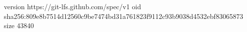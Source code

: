 version https://git-lfs.github.com/spec/v1
oid sha256:809e8b7514d12560c9be7474bd31a761823f9112c93b9038d4532ebf83065873
size 43840
